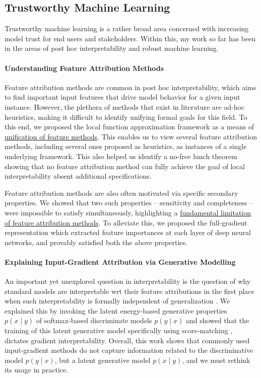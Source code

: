 \documentclass{article}
\renewcommand{\cite}{\citep}
\begin{document}
\subsection*{Trustworthy Machine Learning}
Trustworthy machine learning is a rather broad area concerned with increasing model trust for end users and stakeholders. Within this, my work so far has been in the areas of post hoc interpretability and robust machine learning. 

\paragraph*{Understanding Feature Attribution Methods} Feature attribution methods are common in post hoc interpretability, which aims to find important input features that drive model behavior for a given input instance. However, the plethora of methods that exist in literature are ad-hoc heuristics, making it difficult to identify unifying formal goals for this field. To this end, we proposed the local function approximation framework \cite{han2022which} as a means of \underline{unification of feature methods}. This enables us to view several feature attribution methods, including several ones proposed as heuristics, as instances of a single underlying framework. This also helped us identify a no-free lunch theorem showing that no feature attribution method can fully achieve the goal of local interpretability absent additional specifications.

\vspace*{0.2cm}
\noindent Feature attribution methods are also often motivated via specific secondary properties. We showed \cite{srinivas2019full} that two such properties -- sensitivity and completeness -- were impossible to satisfy simultaneously, highlighting a \underline{fundamental limitation of feature attribution methods}. To alleviate this, we proposed the full-gradient representation which extracted feature importances at each layer of deep neural networks, and provably satisfied both the above properties.

\paragraph{Explaining Input-Gradient Attribution via Generative Modelling} An important yet unexplored question in interpretability is the question of why standard models are interpretable wrt their feature attributions in the first place when such interpretability is formally independent of generalization \cite{srinivas2021rethinking}. We explained this by invoking the latent energy-based generative properties $p(x \mid y)$ of softmax-based discriminate models $p(y \mid x)$ and showed that the training of this latent generative model specifically using score-matching \cite{hyvarinen2005estimation}, dictates gradient interpretability. Overall, this work shows that commonly used input-gradient methods do not capture information related to the discriminative model $p(y \mid x)$, but a latent generative model $p(x \mid y)$, and we must rethink its usage in practice. 
\end{document}
